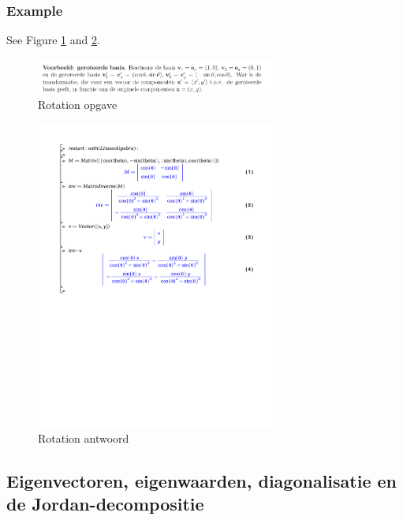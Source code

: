 \documentclass[a4paper]{article}
\begin{document}
\subsubsection{Example}

See Figure \ref{fig:rotation} and \ref{fig:rotationex}.

\begin{figure}[htbp!]
	\begin{center}
		\includegraphics[width=0.7\textwidth]{./images/rotation.png}
	\end{center}
	\caption{Rotation opgave}
	\label{fig:rotation}
\end{figure}

\begin{figure}[htbp!]
	\begin{center}
		\includegraphics[width=0.7\textwidth]{./rotation.pdf}
	\end{center}
	\caption{Rotation antwoord}
	\label{fig:rotationex}
\end{figure}

\subsection{Eigenvectoren, eigenwaarden, diagonalisatie en de Jordan-decompositie}
\end{document}
